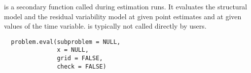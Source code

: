 %
\begin{Description}\relax
{} is a secondary function called during estimation runs. It 
evaluates the structural model and the residual variability model at given
point estimates and at given values of the time variable.  
is typically not called directly by users.
\end{Description}
%
\begin{Usage}
\begin{verbatim}
  problem.eval(subproblem = NULL,
               x = NULL,
               grid = FALSE,
               check = FALSE)
\end{verbatim}
\end{Usage}
%
